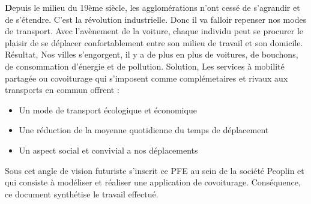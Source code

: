 \clearpage
{}

\begin{general}

\textbf{D}epuis le milieu du 19ème siècle, les agglomérations n’ont cessé de s’agrandir et de s’étendre. C’est la révolution industrielle. Donc il va falloir repenser nos modes de transport.\newline
Avec l’avènement de la voiture, chaque individu peut se procurer le plaisir de se déplacer confortablement entre son milieu de travail et son domicile.\newline
Résultat, Nos villes s’engorgent, il y a de plus en plus de voitures, de bouchons, de consommation d’énergie et de pollution.\newline
Solution, Les services à mobilité partagée ou covoiturage qui s’imposent comme complémetaires et rivaux aux transports en commun offrent :
\begin{itemize}
\item Un mode de transport écologique et économique
\item Une réduction de la moyenne quotidienne du temps de déplacement
\item Un aspect social et convivial a nos déplacements
\end{itemize}
Sous cet angle de vision futuriste s’inscrit ce PFE au sein de la société Peoplin et qui consiste à modéliser et réaliser une application de covoiturage.\newline
Conséquence, ce document synthétise le travail effectué.

\end{general}
